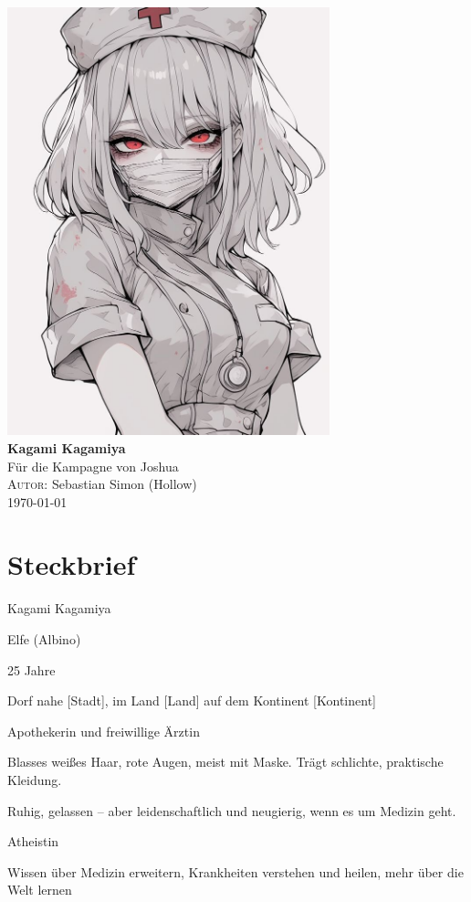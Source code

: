 \documentclass[12pt,a4paper]{article}
\newcommand{\AuthorName}{Sebastian Simon (Hollow)}
\begin{document}
\begin{titlepage}
    \centering
    \vspace*{2cm}
    \includegraphics[width=0.7\textwidth]{kagami.jpg}\\[1.5cm]
    {\Huge\bfseries Kagami Kagamiya}\\[0.5cm]
    {\Large Für die Kampagne von Joshua}\\[2cm]
    \vfill
    \textsc{Autor:} \AuthorName \\
    \vfill
    \today
\end{titlepage}

\newpage
\tableofcontents
\newpage

\section{Steckbrief}
\begin{description}[style=nextline]
  \item[Name:] Kagami Kagamiya
  \item[Rasse:] Elfe (Albino)
  \item[Alter:] 25 Jahre
  \item[Herkunft:] Dorf nahe [Stadt], im Land [Land] auf dem Kontinent [Kontinent]
  \item[Beruf:] Apothekerin und freiwillige Ärztin
  \item[Aussehen:] Blasses weißes Haar, rote Augen, meist mit Maske. Trägt schlichte, praktische Kleidung.
  \item[Charakter:] Ruhig, gelassen – aber leidenschaftlich und neugierig, wenn es um Medizin geht.
  \item[Glaube:] Atheistin
  \item[Ziele:] Wissen über Medizin erweitern, Krankheiten verstehen und heilen, mehr über die Welt lernen
\end{description}
\end{document}
